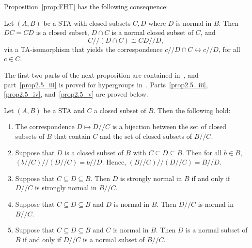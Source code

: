 Proposition~\ref{prop:FHT} has the following consequence:

\begin{lemm}
\label{lem:isom}
Let $(A, B)$ be a STA with closed subsets $C, D$ where $D$ is normal in
$B$. Then $DC = CD$ is a closed subset, $D\cap C$ is a normal closed
subset of $C$, and
\[
C//(D\cap C) \cong CD//D,
\] 
via a TA-isomorphism that yields the correspondence $c//D\cap C
\leftrightarrow c//D$, for all $c \in C$.
\end{lemm}


The first two parts of the next proposition are contained in~\cite
[Proposition 2.13]{BZ}, and part~\ref{prop2.5_iii} is proved for hypergroups in~\cite
[Lemma 4.6]{FZ}. Parts~\ref{prop2.5_iii}, \ref{prop2.5_iv}, and~\ref{prop2.5_v} are proved below.

\begin{prop}
\label{prop:subset_corresp}
Let $(A, B)$ be a STA and $C$ a closed subset of $B$. Then the
following hold:
\begin{enumerate}[label = \textup{(}\roman*\textup{)}] 
\item\label{prop2.5_i} The correspondence $D \mapsto D//C$ is a bijection between the set of
closed subsets of $B$ that contain $C$ and the set of closed subsets of
$B//C$.
\item\label{prop2.5_ii} Suppose that $D$ is a closed subset of $B$ with $C \subseteq D \subseteq
B$. Then for all $b \in B$, $(b//C)//(D//C) = b//D$. Hence,
$(B//C)//(D//C) = B//D$.
\item\label{prop2.5_iii} Suppose that $C \subseteq D \subseteq B$. Then $D$ is strongly normal
in $B$ if and only if $D//C$ is strongly normal in $B//C$.
\item\label{prop2.5_iv} Suppose that $C \subseteq D \subseteq B$ and $D$ is normal in $B$. Then
$D//C$ is normal in $B//C$.
\item\label{prop2.5_v} Suppose that $C \subseteq D \subseteq B$ and $C$ is normal in $B$. Then
$D$ is a normal subset of $B$ if and only if $D//C$ is a normal subset
of $B//C$.
\end{enumerate}
\end{prop}
